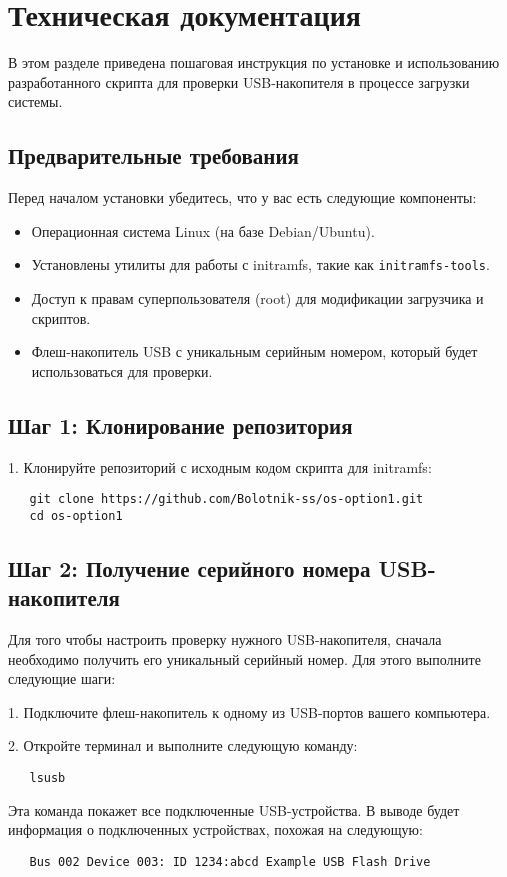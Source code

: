 \documentclass[12pt]{article}
\begin{document}
\section*{Техническая документация}

В этом разделе приведена пошаговая инструкция по установке и использованию разработанного скрипта для проверки USB-накопителя в процессе загрузки системы.

\subsection*{Предварительные требования}

Перед началом установки убедитесь, что у вас есть следующие компоненты:
\begin{itemize}
    \item Операционная система Linux (на базе Debian/Ubuntu).
    \item Установлены утилиты для работы с initramfs, такие как \texttt{initramfs-tools}.
    \item Доступ к правам суперпользователя (root) для модификации загрузчика и скриптов.
    \item Флеш-накопитель USB с уникальным серийным номером, который будет использоваться для проверки.
\end{itemize}

\subsection*{Шаг 1: Клонирование репозитория}

1. Клонируйте репозиторий с исходным кодом скрипта для initramfs:
   \begin{verbatim}
   git clone https://github.com/Bolotnik-ss/os-option1.git
   cd os-option1
   \end{verbatim}

\subsection*{Шаг 2: Получение серийного номера USB-накопителя}

Для того чтобы настроить проверку нужного USB-накопителя, сначала необходимо получить его уникальный серийный номер. Для этого выполните следующие шаги:

1. Подключите флеш-накопитель к одному из USB-портов вашего компьютера.

2. Откройте терминал и выполните следующую команду:
   \begin{verbatim}
   lsusb
   \end{verbatim}
   Эта команда покажет все подключенные USB-устройства. В выводе будет информация о подключенных устройствах, похожая на следующую:
   \begin{verbatim}
   Bus 002 Device 003: ID 1234:abcd Example USB Flash Drive
   \end{verbatim}
\end{document}
